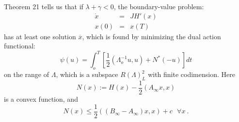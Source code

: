 Theorem 21 tells us that if $\lambda +\gamma < 0$, the boundary-value
problem:
\begin{equation}
\begin{array}{rcl}
  \dot{x}&=&JH' (x)\\
  x(0)&=&x (T)
\end{array}
\end{equation}
has at least one solution
$\overline{x}$, which is found by minimizing the dual
action functional:
\begin{equation}
  \psi (u) = \int_{o}^{T} \left[\frac{1}{2}
  \left(\Lambda_{o}^{-1} u,u\right) + N^{\ast} (-u)\right] dt
\end{equation}
on the range of $\Lambda$, which is a subspace $R (\Lambda)_{L}^{2}$
with finite codimension. Here
\begin{equation}
  N(x) := H(x) - \frac{1}{2} \left(A_{\infty} x,x\right)
\end{equation}
is a convex function, and
\begin{equation}
  N(x) \le \frac{1}{2}
  \left(\left(B_{\infty} - A_{\infty}\right) x,x\right)
  + c\ \ \ \forall x\ .
\end{equation}

